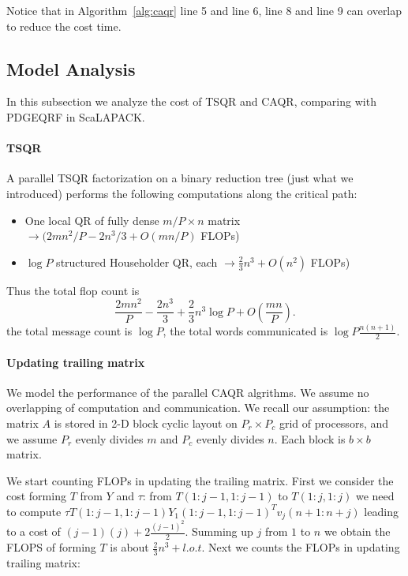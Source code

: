 \documentclass{article}
\begin{document}
Notice that in Algorithm~\ref{alg:caqr} line 5 and line 6, line 8 and line 9 can overlap to reduce the cost time.
\subsection{Model Analysis}
In this subsection we analyze the cost of TSQR and CAQR, comparing with PDGEQRF in ScaLAPACK.
\paragraph{TSQR} A parallel TSQR factorization on a binary reduction tree (just what we introduced) performs the following computations along the critical path:
\begin{itemize}
	\item One local QR of fully dense $m/P \times n$ matrix  $ \to (2mn^2/P - 2n^3/3 + O(mn/P)$ FLOPs)
	\item $\log P $ structured Householder QR, each $\to\frac 23 n^3 + O(n^2)$ FLOPs)
\end{itemize}
Thus the total flop count is \begin{equation}\frac{2 m n^{2}}{P}-\frac{2n^{3}}{3}+\frac{2}{3} n^{3} \log P+O\left(\frac{m n}{P}\right).\end{equation}
the total message count is $\log P$, the total words communicated is 
$\log P \frac{n(n+1)}{2}$.

\paragraph{Updating trailing matrix} We model the performance of the parallel CAQR algrithms. We assume no overlapping of computation and communication. We recall our assumption: the matrix $A$ is stored in 2-D block cyclic layout on $P_r \times P_c$ grid of processors, and we assume $P_r$ evenly divides $m$ and $P_c$ evenly divides $n$. Each block is $b \times b$ matrix.

We start counting FLOPs in updating the trailing matrix.
First we consider the cost forming $T$ from $Y$ and $\tau$: from $T(1:j-1,1:j-1)$ to $T(1:j,1:j)$ we need to compute $\tau T(1:j-1,1:j-1)Y_1(1:j-1,1:j-1)^Tv_j(n+1:n+j)$ leading to a cost of $(j-1)(j) + 2\frac{(j-1)^2}{2}$. Summing up $j$ from $1$ to $n$ we obtain the FLOPS of forming $T$ is about $\frac{2}{3}n^3 + l.o.t$.
Next we counts the FLOPs in updating trailing matrix: 
\end{document}
